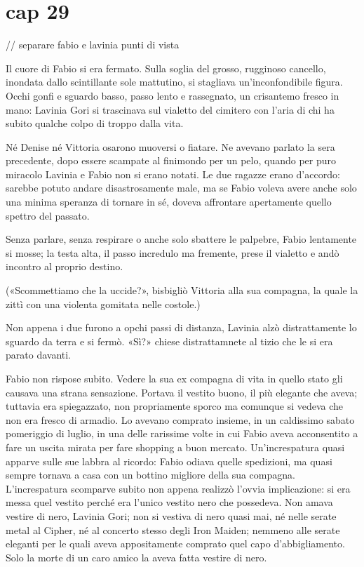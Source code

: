 \chapter{cap 29}

// separare fabio e lavinia punti di vista

Il cuore di Fabio si era fermato. Sulla soglia del grosso, rugginoso cancello, inondata dallo scintillante sole mattutino, si stagliava un'inconfondibile figura. Occhi gonfi e sguardo basso, passo lento e rassegnato, un crisantemo fresco in mano: Lavinia Gori si trascinava sul vialetto del cimitero con l'aria di chi ha subito qualche colpo di troppo dalla vita.

Né Denise né Vittoria osarono muoversi o fiatare. Ne avevano parlato la sera precedente, dopo essere scampate al finimondo per un pelo, quando per puro miracolo Lavinia e Fabio non si erano notati. Le due ragazze erano d'accordo: sarebbe potuto andare disastrosamente male, ma se Fabio voleva avere anche solo una minima speranza di tornare in sé, doveva affrontare apertamente quello spettro del passato.

Senza parlare, senza respirare o anche solo sbattere le palpebre, Fabio lentamente si mosse; la testa alta, il passo incredulo ma fremente, prese il vialetto e andò incontro al proprio destino.

(«Scommettiamo che la uccide?», bisbigliò Vittoria alla sua compagna, la quale la zittì con una violenta gomitata nelle costole.)

Non appena i due furono a opchi passi di distanza, Lavinia alzò distrattamente lo sguardo da terra e si fermò. «Sì?» chiese distrattamnete al tizio che le si era parato davanti.

Fabio non rispose subito. Vedere la sua ex compagna di vita in quello stato gli causava una strana sensazione. Portava il vestito buono, il più elegante che aveva; tuttavia era spiegazzato, non propriamente sporco ma comunque si vedeva che non era fresco di armadio. Lo avevano comprato insieme, in un caldissimo sabato pomeriggio di luglio, in una delle rarissime volte in cui Fabio aveva acconsentito a fare un uscita mirata per fare shopping a buon mercato. Un'increspatura quasi apparve sulle sue labbra al ricordo: Fabio odiava quelle spedizioni, ma quasi sempre tornava a casa con un bottino migliore della sua compagna. L'increspatura scomparve subito non appena realizzò l'ovvia implicazione: si era messa quel vestito perché era l'unico vestito nero che possedeva. Non amava vestire di nero, Lavinia Gori; non si vestiva di nero quasi mai, né nelle serate metal al Cipher, né al concerto stesso degli Iron Maiden; nemmeno alle serate eleganti per le quali aveva appositamente comprato quel capo d'abbigliamento. Solo la morte di un caro amico la aveva fatta vestire di nero.

